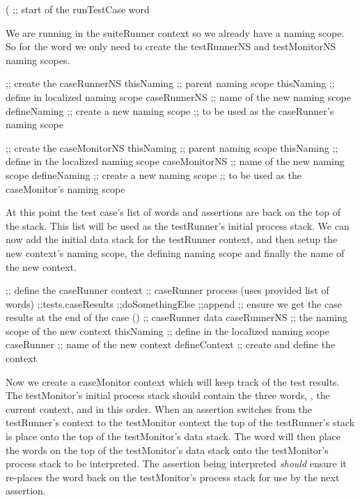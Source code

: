 
\startJoylolCode
(               ;; start of the runTestCase word
\stopJoylolCode

We are running in the suiteRunner context so we already have a 
 naming scope. So for the  word we only 
need to create the testRunnerNS and testMonitorNS naming scopes. 

\startJoylolCode
  ;; create the caseRunnerNS
  thisNaming   ;; parent naming scope
  thisNaming   ;; define in localized naming scope
  caseRunnerNS ;; name of the new naming scope
  defineNaming ;; create a new naming scope
               ;; to be used as the caseRunner's naming scope
\stopJoylolCode

\startJoylolCode
  ;; create the caseMonitorNS
  thisNaming    ;; parent naming scope
  thisNaming    ;; define in the localized naming scope
  caseMonitorNS ;; name of the new naming scope
  defineNaming  ;; create a new naming scope
                ;; to be used as the caseMonitor's naming scope
\stopJoylolCode

At this point the test case's list of words and assertions are back on the 
top of the stack. This list will be used as the testRunner's initial 
process stack. We can now add the initial data stack for the testRunner 
context, and then setup the new context's naming scope, the defining 
naming scope and finally the name of the new context.

\startJoylolCode
  ;; define the caseRunner context
                ;; caseRunner process (uses provided list of words)
  ;;tests.caseResults
  ;;doSomethingElse
  ;;append        ;; ensure we get the case results at the end of the case
  ()            ;; caseRunner data
  caseRunnerNS  ;; the naming scope of the new context
  thisNaming    ;; define in the localized naming scope
  caseRunner    ;; name of the new context
  defineContext ;; create and define the context
\stopJoylolCode

Now we create a caseMonitor context which will keep track of the test 
results. The testMonitor's initial process stack should contain the three 
words, , the current context, and  in this 
order. When an assertion switches from the testRunner's context to the 
testMonitor context the top of the testRunner's stack is place onto the 
top of the testMonitor's data stack. The  word will then 
place the words on the top of the testMonitor's data stack onto the 
testMonitor's process stack to be interpreted. The assertion being 
interpreted \emph{should} ensure it re-places the  word 
back on the testMonitor's process stack for use by the next assertion. 

